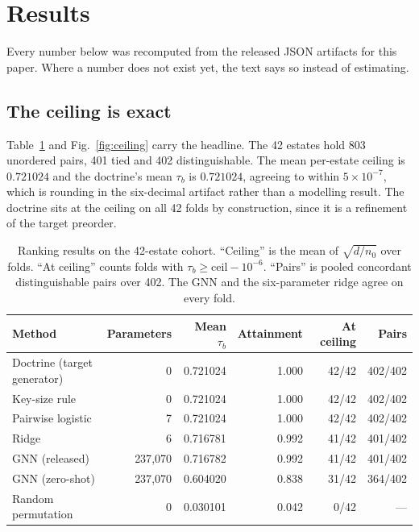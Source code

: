 \documentclass[journal,10pt]{IEEEtran}
\newcommand{\tb}{\tau_b}
\newcommand{\ceilv}{\mathrm{ceil}}
\newcommand{\distinct}{d}
\newcommand{\nzero}{n_0}
\begin{document}
\section{Results}
\label{sec:results}

Every number below was recomputed from the released JSON artifacts for this paper. Where a number
does not exist yet, the text says so instead of estimating.

\subsection{The ceiling is exact}

Table~\ref{tab:ranking} and Fig.~\ref{fig:ceiling} carry the headline. The 42 estates hold 803
unordered pairs, 401 tied and 402 distinguishable. The mean per-estate ceiling is $0.721024$ and the
doctrine's mean $\tb$ is $0.721024$, agreeing to within $5\times10^{-7}$, which is rounding in the
six-decimal artifact rather than a modelling result. The doctrine sits at the ceiling on all 42
folds by construction, since it is a refinement of the target preorder.

\begin{table}[t]
\centering
\caption{Ranking results on the 42-estate cohort. ``Ceiling'' is the mean of
$\sqrt{\distinct/\nzero}$ over folds. ``At ceiling'' counts folds with
$\tb\ge\ceilv-10^{-6}$. ``Pairs'' is pooled concordant distinguishable pairs over 402. The GNN and
the six-parameter ridge agree on every fold.}
\label{tab:ranking}
\footnotesize
\begin{tabular}{@{}lrrrrr@{}}
\toprule
Method & Parameters & Mean $\tb$ & Attainment & At ceiling & Pairs \\
\midrule
Doctrine (target generator) & 0 & 0.721024 & 1.000 & 42/42 & 402/402 \\
Key-size rule & 0 & 0.721024 & 1.000 & 42/42 & 402/402 \\
Pairwise logistic & 7 & 0.721024 & 1.000 & 42/42 & 402/402 \\
Ridge & 6 & 0.716781 & 0.992 & 41/42 & 401/402 \\
GNN (released) & 237{,}070 & 0.716782 & 0.992 & 41/42 & 401/402 \\
GNN (zero-shot) & 237{,}070 & 0.604020 & 0.838 & 31/42 & 364/402 \\
Random permutation & 0 & 0.030101 & 0.042 & 0/42 & --- \\
\bottomrule
\end{tabular}
\end{table}
\end{document}
